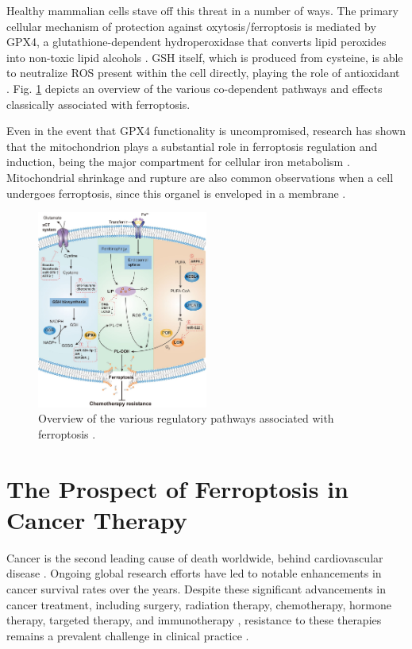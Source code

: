 Healthy mammalian cells stave off this threat in a number of ways. The primary cellular mechanism of protection against oxytosis/ferroptosis is mediated by \ac{GPX4}, a glutathione-dependent hydroperoxidase that converts lipid peroxides into non-toxic lipid alcohols \citep{gpx4}. \ac{GSH} itself, which is produced from cysteine, is able to neutralize \ac{ROS} present within the cell directly, playing the role of antioxidant \citep{glutath}. Fig. \ref{fig:ferro_mech} depicts an overview of the various co-dependent pathways and effects classically associated with ferroptosis.

Even in the event that \ac{GPX4} functionality is uncompromised, research has shown that the mitochondrion plays a substantial role in ferroptosis regulation and induction, being the major compartment for cellular iron metabolism \citep{mito_ferro2}. Mitochondrial shrinkage and rupture are also common observations when a cell undergoes ferroptosis, since this organel is enveloped in a membrane \citep{mito_ferro}.

\begin{figure}[ht]
	\begin{center}
		\includegraphics[width = 0.5\textwidth]{Fig/ferroptosis.png}
		\end{center}
		\caption{Overview of the various regulatory pathways associated with ferroptosis \citep{ferro_cancer}.}\label{fig:ferro_mech}
\end{figure}

\section{The Prospect of Ferroptosis in Cancer Therapy}

Cancer is the second leading cause of death worldwide, behind cardiovascular disease \citep{cancer}. Ongoing global research efforts have led to notable enhancements in cancer survival rates over the years. Despite these significant advancements in cancer treatment, including surgery, radiation therapy, chemotherapy, hormone therapy, targeted therapy, and immunotherapy \citep{therapies}, resistance to these therapies remains a prevalent challenge in clinical practice \citep{therapy_resistance}.

